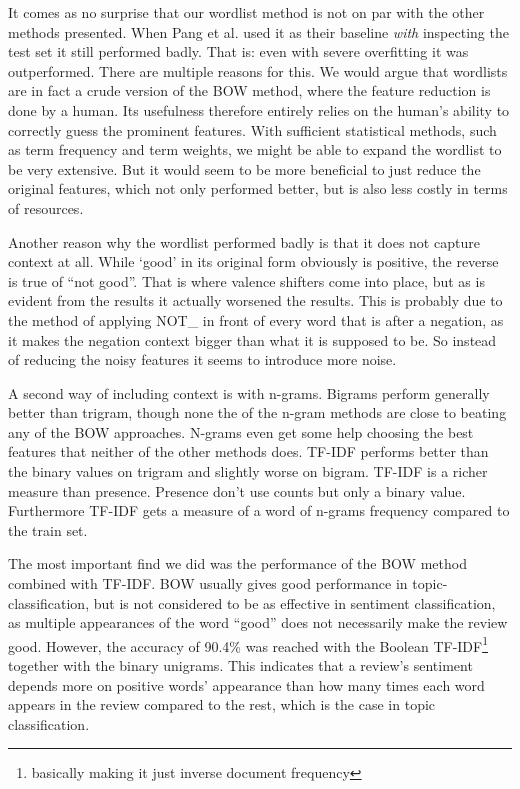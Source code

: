\documentclass{article}
\begin{document}
It comes as no surprise that our wordlist method is not on par with the other methods presented. When Pang et al. used it as their baseline \textit{with} inspecting the test set it still performed badly. That is: even with severe overfitting it was outperformed. There are multiple reasons for this. We would argue that wordlists are in fact a crude version of the BOW method, where the feature reduction is done by a human. Its usefulness therefore entirely relies on the human’s ability to correctly guess the prominent features. With sufficient statistical methods, such as term frequency and term weights, we might be able to expand the wordlist to be very extensive. But it would seem to be more beneficial to just reduce the original features, which not only performed better, but is also less costly in terms of resources.
\smallskip

Another reason why the wordlist performed badly is that it does not capture context at all. While ‘good’ in its original form obviously is positive, the reverse is true of “not good”. That is where valence shifters come into place, but as is evident from the results it actually worsened the results. This is probably due to the method of applying NOT\_ in front of every word that is after a negation, as it makes the negation context bigger than what it is supposed to be. So instead of reducing the noisy features it seems to introduce more noise.
\smallskip

A second way of including context is with n-grams. Bigrams perform generally better than trigram, though none the of the n-gram methods are close to beating any of the BOW approaches. N-grams even get some help choosing the best features that neither of the other methods does. TF-IDF performs better than the binary values on trigram and slightly worse on bigram. TF-IDF is a richer measure than presence. Presence don’t use counts but only a binary value. Furthermore TF-IDF gets a measure of a word of n-grams frequency compared to the train set.  
\smallskip

The most important find we did was the performance of the BOW method combined with TF-IDF. BOW usually gives good performance in topic-classification, but is not considered to be as effective in sentiment classification, as multiple appearances of the word “good” does not necessarily make the review good. 
However, the accuracy of 90.4\% was reached with the Boolean TF-IDF\footnote{basically making it just inverse document frequency} together with the binary unigrams. This indicates that a review’s sentiment depends more on positive words’ appearance than how many times each word appears in the review compared to the rest, which is the case in topic classification. 
\end{document}
